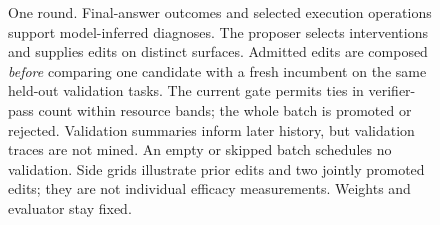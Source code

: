 \begin{figure}[tbp]
{\begin{tikzpicture}
\end{tikzpicture}}
\caption{One \sh{} round. Final-answer outcomes and selected execution operations
support model-inferred diagnoses. The proposer selects interventions and supplies
edits on distinct surfaces. Admitted edits are composed \emph{before} comparing
one candidate with a fresh incumbent on the same held-out validation tasks.
The current gate permits ties in verifier-pass count within resource bands;
the whole batch is promoted or rejected. Validation summaries inform later
history, but validation traces are not mined. An empty or skipped batch schedules
no validation. Side grids illustrate prior edits and two jointly promoted edits;
they are not individual efficacy measurements. Weights and evaluator stay fixed.}
\label{fig:sh-loop}
\end{figure}
